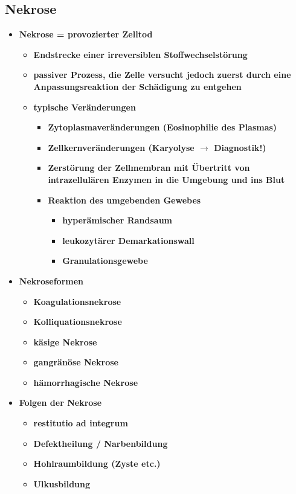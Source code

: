 \subsection{Nekrose}
	\begin{itemize}
		\item \textbf{Nekrose = provozierter Zelltod}
			\begin{itemize}
				\item \textbf{Endstrecke einer irreversiblen Stoffwechselstörung}
				\item \textbf{passiver Prozess, die Zelle versucht jedoch zuerst durch eine Anpassungsreaktion der Schädigung zu entgehen}
				\item \textbf{typische Veränderungen}
					\begin{itemize}
						\item \textbf{Zytoplasmaveränderungen (Eosinophilie des Plasmas)}
						\item \textbf{Zellkernveränderungen (Karyolyse $\rightarrow$ Diagnostik!)}
						\item \textbf{Zerstörung der Zellmembran mit Übertritt von intrazellulären Enzymen in die Umgebung und ins Blut}
						\item \textbf{Reaktion des umgebenden Gewebes}
							\begin{itemize}
								\item \textbf{hyperämischer Randsaum}
								\item \textbf{leukozytärer Demarkationswall}
								\item \textbf{Granulationsgewebe}
							\end{itemize}
					\end{itemize}
			\end{itemize}
		\item \textbf{Nekroseformen}
			\begin{itemize}
				\item \textbf{Koagulationsnekrose}
				\item \textbf{Kolliquationsnekrose}
				\item \textbf{käsige Nekrose}
				\item \textbf{gangränöse Nekrose}
				\item \textbf{hämorrhagische Nekrose}
			\end{itemize}
		\item \textbf{Folgen der Nekrose}
			\begin{itemize}
				\item \textbf{restitutio ad integrum}
				\item \textbf{Defektheilung / Narbenbildung}
				\item \textbf{Hohlraumbildung (Zyste etc.)}
				\item \textbf{Ulkusbildung}
			\end{itemize}
	\end{itemize}

